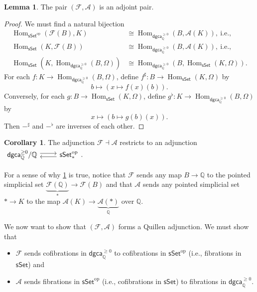 \documentclass[10pt,letterpaper,cm]{nupset}
\theoremstyle{definition}
\theoremstyle{theorem}
\newtheorem{lemma}[defn]{Lemma}
\newtheorem{corollary}[defn]{Corollary}
\theoremstyle{remark}
\newcommand{\A}{\mathcal A}
\newcommand{\F}{\mathcal F}
\newcommand{\Q}{\mathbb Q}
\newcommand{\1}{\mathbb{1}}
\newcommand{\dgca}{\mathsf{dgca}}
\newcommand{\0}{\vec 0}
\DeclareMathOperator{\Hom}{Hom}
\DeclareMathOperator{\op}{op}
\newcommand{\bi}{\begin{itemize}}
\newcommand{\ei}{\end{itemize}}
\begin{document}
\begin{lemma}\label{mainadj}
The pair $\left(\F, \A\right)$ is an adjoint pair.
\end{lemma}
\begin{proof}
We must find a natural bijection
\begin{align*}
\Hom_{\mathsf{sSet}^{\op}}(\F(B), K) &  \cong \Hom_{\dgca_{\Q}^{\geq 0}}(B, \A(K)),\ \text{i.e.,}
\\ \Hom_{\mathsf{sSet}}(K, \F(B)) &  \cong \Hom_{\dgca_{\Q}^{\geq 0}}(B, \A(K)),\ \text{i.e.,}
\\ \Hom_{\mathsf{sSet}}(K, \Hom_{\dgca_{\Q}^{\geq 0}}(B, \Omega)) &  \cong \Hom_{\dgca_{\Q}^{\geq 0}}(B, \Hom_{\mathsf{sSet}}(K, \Omega)).
\end{align*}
For each $f: K \to \Hom_{\dgca_{\Q}^{\geq 0}}(B, \Omega)$, define $f^{\sharp} : B \to \Hom_{\mathsf{sSet}}(K, \Omega)$ by
\[
b \mapsto \left(x \mapsto f(x)(b)\right).
\] Conversely, for each $g : B \to \Hom_{\mathsf{sSet}}(K, \Omega)$, define $g^{\flat} : K \to \Hom_{\dgca_{\Q}^{\geq 0}}(B, \Omega)$ by
\[
x \mapsto \left(b \mapsto g(b)(x)\right)
.\] Then ${-}^{\sharp}$ and ${-}^{\flat}$ are inverses of each other. 
\end{proof} 

\begin{corollary}\label{overadj}
The adjunction $\F \dashv \A$ restricts to an adjunction $
\begin{tikzcd}
	{\dgca_{\Q}^{\geq 0}/\Q} & {\mathsf{sSet}_{\ast}^{\op}}
	\arrow[shift left=1, from=1-1, to=1-2]
	\arrow[shift left=1, from=1-2, to=1-1]
\end{tikzcd}
.$
\end{corollary}

For a sense of why \cref{overadj} is true, notice that $\F$ sends any map $B \to \Q$ to the pointed simplicial set $\underbrace{\F(\Q)}_{\ast} \to \F(B)$ and that $\A$ sends any pointed simplicial set $\ast \to K$ to the map $\A(K) \to \underbrace{\A(\ast)}_{\Q}$ over $\Q$.

\medskip

We now want to show that $\left(\F, \A\right)$ forms a Quillen adjunction. We must show that 
\bi
\item $\F$ sends cofibrations in $\dgca_{\Q}^{\geq 0}$ to cofibrations in $\mathsf{sSet}^{\op}$ (i.e., fibrations in $\mathsf{sSet}$) and
\item $\A$ sends fibrations in  $\mathsf{sSet}^{\op}$ (i.e., cofibrations in $\mathsf{sSet}$) to fibrations in $\dgca_{\Q}^{\geq 0}$.
\ei
\end{document}
